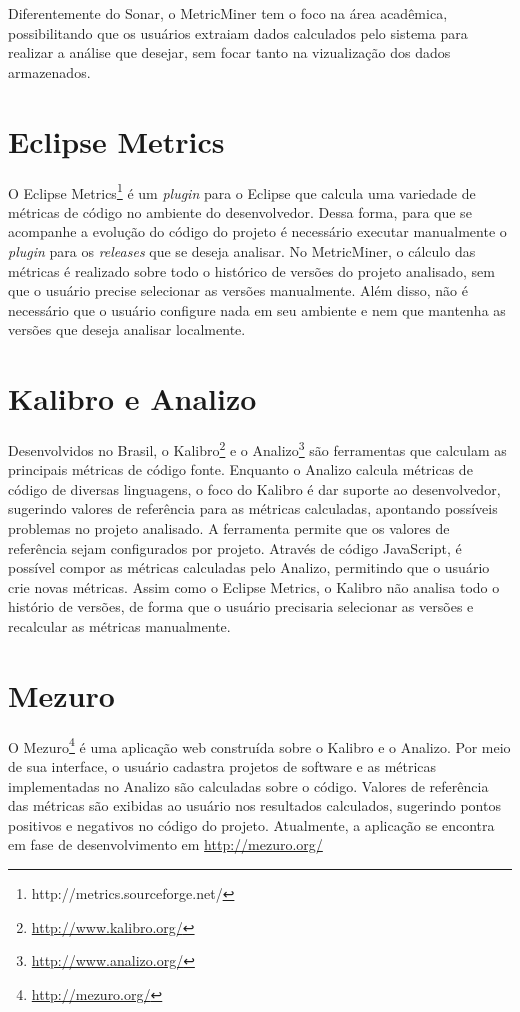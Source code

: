 \documentclass[a4paper, 12pt, twoside]{book}
\begin{document}
    Diferentemente do Sonar, o MetricMiner tem o foco na área acadêmica, possibilitando que os usuários extraiam dados calculados pelo sistema para realizar a análise que desejar, sem focar tanto na vizualização dos dados armazenados.

\section*{Eclipse Metrics}
    O Eclipse Metrics\footnote{http://metrics.sourceforge.net/} é um \textit{plugin} para o Eclipse que calcula uma variedade de métricas de código no ambiente do desenvolvedor. Dessa forma, para que se acompanhe a evolução do código do projeto é necessário executar manualmente o \textit{plugin} para os \textit{releases} que se deseja analisar. No MetricMiner, o cálculo das métricas é realizado sobre todo o histórico de versões do projeto analisado, sem que o usuário precise selecionar as versões manualmente. Além disso, não é necessário que o usuário configure nada em seu ambiente e nem que mantenha as versões que deseja analisar localmente.
    
\section*{Kalibro e Analizo}
    Desenvolvidos no Brasil, o Kalibro\footnote{\url{http://www.kalibro.org/}} e o Analizo\footnote{\url{http://www.analizo.org/}} são ferramentas que calculam as principais métricas de código fonte. Enquanto o Analizo calcula métricas de código de diversas linguagens, o foco do Kalibro é dar suporte ao desenvolvedor, sugerindo valores de referência para as métricas calculadas, apontando possíveis problemas no projeto analisado. A ferramenta permite que os valores de referência sejam configurados por projeto. Através de código JavaScript, é possível compor as métricas calculadas pelo Analizo, permitindo que o usuário crie novas métricas. Assim como o Eclipse Metrics, o Kalibro não analisa todo o histório de versões, de forma que o usuário precisaria selecionar as versões e recalcular as métricas manualmente.

\section*{Mezuro}
    O Mezuro\footnote{\url{http://mezuro.org/}} é uma aplicação web construída sobre o Kalibro e o Analizo. Por meio de sua interface, o usuário cadastra projetos de software e as métricas implementadas no Analizo são calculadas sobre o código. Valores de referência das métricas são exibidas ao usuário nos resultados calculados, sugerindo pontos positivos e negativos no código do projeto. Atualmente, a aplicação se encontra em fase de desenvolvimento em \url{http://mezuro.org/}
\end{document}
